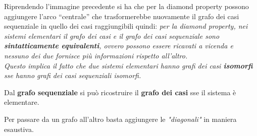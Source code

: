 \begin{nota}
Riprendendo l'immagine precedente si ha che per la diamond property possono
aggiungere l'arco ``centrale'' che trasformerebbe nuovamente il grafo dei casi
sequenziale in quello dei casi raggiungibili quindi:
\textit{per la diamond property, nei sistemi elementari il grafo dei casi e il
  grafo dei casi sequenziale sono \textbf{sintatticamente equivalenti}, ovvero
  possono essere ricavati a vicenda e nessuno dei due fornisce più informazioni rispetto all'altro.\\
  Questo implica il fatto che due sistemi elementari hanno grafi dei casi
  \textbf{isomorfi} sse hanno grafi dei casi sequenziali isomorfi.} 
\end{nota}
  \begin{definizione}
    Dal \textbf{grafo sequenziale} si può ricostruire il \textbf{grafo dei casi} sse il sistema è elementare.
  \end{definizione} \vspace{5mm} %
  \begin{nota}
  Per passare da un grafo all'altro basta aggiungere le \textit{"diagonali"} in maniera esaustiva.
  \end{nota}
